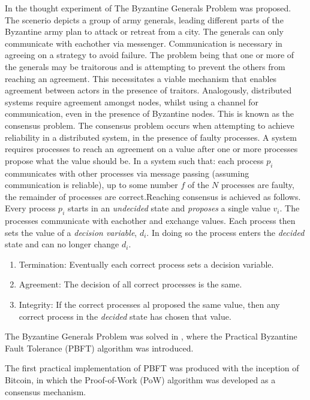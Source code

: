 In \cite{lamport_byzantine_1982} the thought experiment of The Byzantine Generals Problem was proposed. 
The scenerio depicts a group of army generals, leading different parts of the Byzantine army plan to attack or retreat from a city. 
The generals can only communicate with eachother via messenger. Communication is necessary in agreeing on a strategy to avoid failure. 
The problem being that one or more of the generals may be traitorous and is attempting to prevent the others from reaching an agreement. 
This necessitates a viable mechanism that enables agreement between actors in the presence of traitors. 
Analogously, distributed systems require agreement amongst nodes, whilst using a channel for communication, even in the presence of Byzantine nodes. This is known as the consensus problem. \cite{fischer_consensus_1983}
The consensus problem occurs when attempting to achieve reliability in a distributed system, in the presence of faulty processes. 
A system requires processes to reach an \emph agreement on a value after one or more processes propose what the value should be. 
In a system such that: each process $p_i$ communicates with other processes via message passing (assuming communication is reliable), up to some number $f$ of the $N$ processes are faulty, the remainder of processes are correct.\linebreak[1]
Reaching consensus is achieved as follows. 
Every process $ p_i $ starts in an \emph{undecided} state and \emph{proposes} a single value $v_i$.
The processes communicate with eachother and exchange values. 
Each process then sets the value of a \emph{decision variable}, $d_i$. 
In doing so the process enters the \emph{decided} state and can no longer change $d_i$.\cite{coulouris_distributed_2011}
\begin{enumerate}
	\item Termination: Eventually each correct process sets a decision variable.
	\item Agreement: The decision of all correct processes is the same.
	\item Integrity: If the correct processes al proposed the same value, then any correct process in the \emph{decided} state has chosen that value.\cite{coulouris_distributed_2011}
\end{enumerate}

The Byzantine Generals Problem was solved in \cite{castro_practical_1999}, where the Practical Byzantine Fault Tolerance (PBFT) algorithm was introduced.

The first practical implementation of PBFT was produced with the inception of Bitcoin, in which the Proof-of-Work (PoW) algorithm was developed as a consensus mechanism. \cite{nakamoto_bitcoin_2019}

